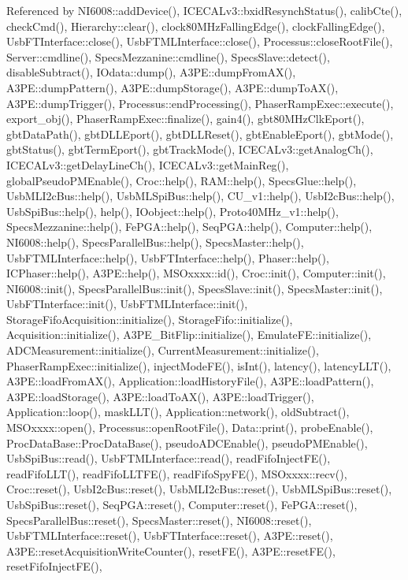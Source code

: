 Referenced by N\+I6008\+::add\+Device(), I\+C\+E\+C\+A\+Lv3\+::bxid\+Resynch\+Status(), calib\+Cte(), check\+Cmd(), Hierarchy\+::clear(), clock80\+M\+Hz\+Falling\+Edge(), clock\+Falling\+Edge(), Usb\+F\+T\+Interface\+::close(), Usb\+F\+T\+M\+L\+Interface\+::close(), Processus\+::close\+Root\+File(), Server\+::cmdline(), Specs\+Mezzanine\+::cmdline(), Specs\+Slave\+::detect(), disable\+Subtract(), I\+Odata\+::dump(), A3\+P\+E\+::dump\+From\+A\+X(), A3\+P\+E\+::dump\+Pattern(), A3\+P\+E\+::dump\+Storage(), A3\+P\+E\+::dump\+To\+A\+X(), A3\+P\+E\+::dump\+Trigger(), Processus\+::end\+Processing(), Phaser\+Ramp\+Exec\+::execute(), export\+\_\+obj(), Phaser\+Ramp\+Exec\+::finalize(), gain4(), gbt80\+M\+Hz\+Clk\+Eport(), gbt\+Data\+Path(), gbt\+D\+L\+L\+Eport(), gbt\+D\+L\+L\+Reset(), gbt\+Enable\+Eport(), gbt\+Mode(), gbt\+Status(), gbt\+Term\+Eport(), gbt\+Track\+Mode(), I\+C\+E\+C\+A\+Lv3\+::get\+Analog\+Ch(), I\+C\+E\+C\+A\+Lv3\+::get\+Delay\+Line\+Ch(), I\+C\+E\+C\+A\+Lv3\+::get\+Main\+Reg(), global\+Pseudo\+P\+M\+Enable(), Croc\+::help(), R\+A\+M\+::help(), Specs\+Glue\+::help(), Usb\+M\+L\+I2c\+Bus\+::help(), Usb\+M\+L\+Spi\+Bus\+::help(), C\+U\+\_\+v1\+::help(), Usb\+I2c\+Bus\+::help(), Usb\+Spi\+Bus\+::help(), help(), I\+Oobject\+::help(), Proto40\+M\+Hz\+\_\+v1\+::help(), Specs\+Mezzanine\+::help(), Fe\+P\+G\+A\+::help(), Seq\+P\+G\+A\+::help(), Computer\+::help(), N\+I6008\+::help(), Specs\+Parallel\+Bus\+::help(), Specs\+Master\+::help(), Usb\+F\+T\+M\+L\+Interface\+::help(), Usb\+F\+T\+Interface\+::help(), Phaser\+::help(), I\+C\+Phaser\+::help(), A3\+P\+E\+::help(), M\+S\+Oxxxx\+::id(), Croc\+::init(), Computer\+::init(), N\+I6008\+::init(), Specs\+Parallel\+Bus\+::init(), Specs\+Slave\+::init(), Specs\+Master\+::init(), Usb\+F\+T\+Interface\+::init(), Usb\+F\+T\+M\+L\+Interface\+::init(), Storage\+Fifo\+Acquisition\+::initialize(), Storage\+Fifo\+::initialize(), Acquisition\+::initialize(), A3\+P\+E\+\_\+\+Bit\+Flip\+::initialize(), Emulate\+F\+E\+::initialize(), A\+D\+C\+Measurement\+::initialize(), Current\+Measurement\+::initialize(), Phaser\+Ramp\+Exec\+::initialize(), inject\+Mode\+F\+E(), is\+Int(), latency(), latency\+L\+L\+T(), A3\+P\+E\+::load\+From\+A\+X(), Application\+::load\+History\+File(), A3\+P\+E\+::load\+Pattern(), A3\+P\+E\+::load\+Storage(), A3\+P\+E\+::load\+To\+A\+X(), A3\+P\+E\+::load\+Trigger(), Application\+::loop(), mask\+L\+L\+T(), Application\+::network(), old\+Subtract(), M\+S\+Oxxxx\+::open(), Processus\+::open\+Root\+File(), Data\+::print(), probe\+Enable(), Proc\+Data\+Base\+::\+Proc\+Data\+Base(), pseudo\+A\+D\+C\+Enable(), pseudo\+P\+M\+Enable(), Usb\+Spi\+Bus\+::read(), Usb\+F\+T\+M\+L\+Interface\+::read(), read\+Fifo\+Inject\+F\+E(), read\+Fifo\+L\+L\+T(), read\+Fifo\+L\+L\+T\+F\+E(), read\+Fifo\+Spy\+F\+E(), M\+S\+Oxxxx\+::recv(), Croc\+::reset(), Usb\+I2c\+Bus\+::reset(), Usb\+M\+L\+I2c\+Bus\+::reset(), Usb\+M\+L\+Spi\+Bus\+::reset(), Usb\+Spi\+Bus\+::reset(), Seq\+P\+G\+A\+::reset(), Computer\+::reset(), Fe\+P\+G\+A\+::reset(), Specs\+Parallel\+Bus\+::reset(), Specs\+Master\+::reset(), N\+I6008\+::reset(), Usb\+F\+T\+M\+L\+Interface\+::reset(), Usb\+F\+T\+Interface\+::reset(), A3\+P\+E\+::reset(), A3\+P\+E\+::reset\+Acquisition\+Write\+Counter(), reset\+F\+E(), A3\+P\+E\+::reset\+F\+E(), reset\+Fifo\+Inject\+F\+E(), 